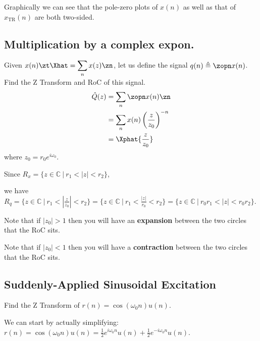 Graphically we can see that the pole-zero plots of $x(n)$ as well as that of $x_{\text{TR}}(n)$ are both two-sided.

\subsection{Multiplication by a complex expon.}
Given $x(n)\zt\Xhat=\displaystyle\sum_n x(z)\zn$, let us define the signal $q(n)\triangleq\zopn x(n)$. \\
Find the Z Transform and RoC of this signal.
\begin{align*}
    \hat Q(z) 
    &= \sum_n \zopn x(n)\zn
    \\
    &= \sum_n x(n)\left(\frac{z}{z_0}\right)^{-n}
    \\
    &= \Xphat{\frac{z}{z_0}}
\end{align*}
where $z_0=r_0e^{i\omega_0}$.

Since $R_x=\{z\in\mathbb C\ \Big|\ r_1<|z|<r_2\}$,

we have $R_{q} = \{z\in\mathbb C\ \Big|\ r_1<\left|\frac{z}{z_0}\right|<r_2\}
= \{z\in\mathbb C\ \Big|\ r_1<\frac{|z|}{r_0}<r_2\}
= \{z\in\mathbb C\ \Big|\ {r_0}r_1<{|z|}<{r_0}r_2\}$.

Note that if $|z_0|>1$ then you will have an \textbf{expansion} between the two circles that the RoC sits.

Note that if $|z_0|<1$ then you will have a \textbf{contraction} between the two circles that the RoC sits.

\subsection{Suddenly-Applied Sinusoidal Excitation}
Find the Z Transform of $r(n)=\cos(\omega_0 n) u(n)$.

We can start by actually simplifying: $r(n)=\cos(\omega_0 n) u(n) = \frac12e^{i\omega_0 n}u(n)+\frac12e^{-i\omega_0 n}u(n)$.

